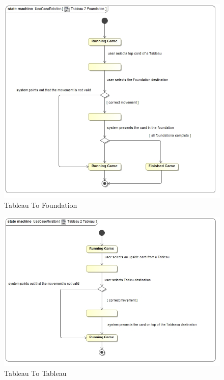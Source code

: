 \documentclass[11pt]{article}
\begin{document}
\begin{center}
 \begin{figure}[H]
 \begin{center}
   \includegraphics[width=15cm]{DomainModel/Tableau2Foundation.jpg}
   \caption{Tableau To Foundation}
   \label{fig:tableau2foundation}
 \end{center}
 \end{figure}
\end{center}

\begin{center}
 \begin{figure}[H]
 \begin{center}
   \includegraphics[width=15cm]{DomainModel/Tableau2Tableau.jpg}
   \caption{Tableau To Tableau}
   \label{fig:tableau2tableau}
 \end{center}
 \end{figure}
\end{center}
\end{document}
